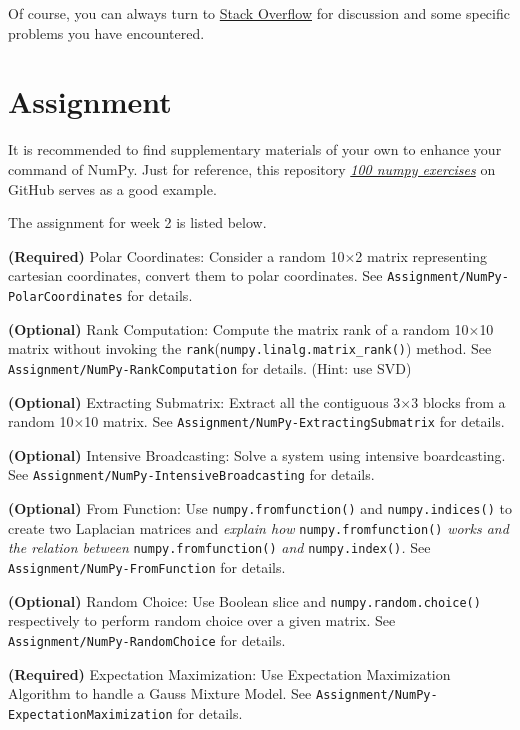 \documentclass[english]{../TeXTemplate/pkupaper}
\begin{document}
Of course, you can always turn to \href{https://stackoverflow.com/}{Stack Overflow} for discussion and some specific problems you have encountered.

\section{Assignment}

It is recommended to find supplementary materials of your own to enhance your command of NumPy. Just for reference, this repository \href{https://github.com/rougier/numpy-100}{\emph{100 numpy exercises}} on GitHub serves as a good example.

The assignment for week 2 is listed below.

\begin{partlist}
\item \textbf{(Required)} Polar Coordinates: Consider a random 10$\times $2 matrix representing cartesian coordinates, convert them to polar coordinates. See \verb"Assignment/NumPy-PolarCoordinates" for details.
\item \textbf{(Optional)} Rank Computation: Compute the matrix rank of a random 10$\times $10 matrix without invoking the \verb"rank"(\verb"numpy.linalg.matrix_rank()") method. See \verb"Assignment/NumPy-RankComputation" for details. (Hint: use SVD)
\item \textbf{(Optional)} Extracting Submatrix: Extract all the contiguous 3$\times $3 blocks from a random 10$\times $10 matrix. See \verb"Assignment/NumPy-ExtractingSubmatrix" for details.
\item \textbf{(Optional)} Intensive Broadcasting: Solve a system using intensive boardcasting. See \verb"Assignment/NumPy-IntensiveBroadcasting" for details.
\item \textbf{(Optional)} From Function: Use \verb"numpy.fromfunction()" and \verb"numpy.indices()" to create two Laplacian matrices and \emph{explain how} \verb"numpy.fromfunction()" \emph{works and the relation between} \verb"numpy.fromfunction()" \emph{and} \verb"numpy.index()"\emph{.} See \verb"Assignment/NumPy-FromFunction" for details.
\item \textbf{(Optional)} Random Choice: Use Boolean slice and \verb"numpy.random.choice()" respectively to perform random choice over a given matrix. See \verb"Assignment/NumPy-RandomChoice" for details.
\item \textbf{(Required)} Expectation Maximization: Use Expectation Maximization Algorithm to handle a Gauss Mixture Model. See \verb"Assignment/NumPy-ExpectationMaximization" for details.
\end{partlist}
\end{document}
